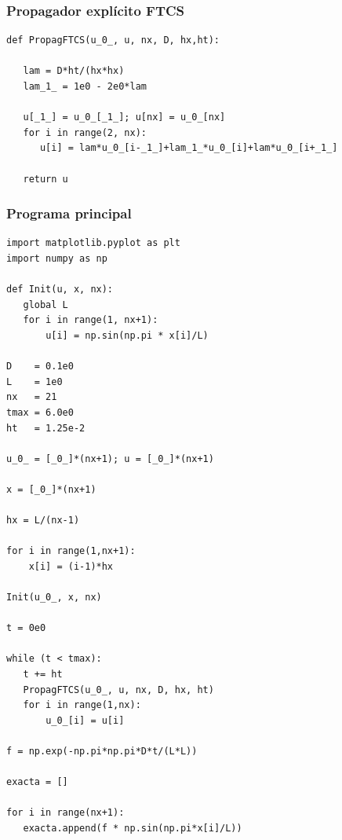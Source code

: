 {
\begin{frame}[fragile]
\frametitle{Propagador explícito FTCS}
\begin{lstlisting}[caption=Propagador explícito FTCS para la ecuación de difusión, style=FormattedNumber, basicstyle=\linespread{1.1}\ttfamily=\small, columns=fullflexible]
def PropagFTCS(u_0_, u, nx, D, hx,ht):

   lam = D*ht/(hx*hx) 
   lam_1_ = 1e0 - 2e0*lam

   u[_1_] = u_0_[_1_]; u[nx] = u_0_[nx]
   for i in range(2, nx):
      u[i] = lam*u_0_[i-_1_]+lam_1_*u_0_[i]+lam*u_0_[i+_1_]
      
   return u
\end{lstlisting}
\end{frame}
\begin{frame}
\frametitle{Programa principal}
\begin{lstlisting}[caption=Programa principal para el ejercicio, style=FormattedNumber, basicstyle=\linespread{1.1}\ttfamily=\small, columns=fullflexible]
import matplotlib.pyplot as plt
import numpy as np

def Init(u, x, nx):
   global L
   for i in range(1, nx+1):
       u[i] = np.sin(np.pi * x[i]/L)

D    = 0.1e0
L    = 1e0
nx   = 21
tmax = 6.0e0
ht   = 1.25e-2

u_0_ = [_0_]*(nx+1); u = [_0_]*(nx+1)

x = [_0_]*(nx+1)

hx = L/(nx-1)

for i in range(1,nx+1):
    x[i] = (i-1)*hx

Init(u_0_, x, nx)

t = 0e0

while (t < tmax):
   t += ht
   PropagFTCS(u_0_, u, nx, D, hx, ht)
   for i in range(1,nx):
       u_0_[i] = u[i]                  

f = np.exp(-np.pi*np.pi*D*t/(L*L))

exacta = []

for i in range(nx+1):
   exacta.append(f * np.sin(np.pi*x[i]/L))


\end{lstlisting}
\end{frame}}
